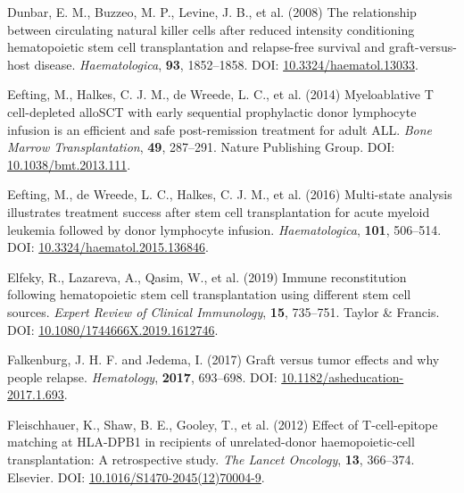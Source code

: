\documentclass[
  letterpaper,
  DIV=11,
  numbers=noendperiod]{scrreprt}
\newlength{\cslhangindent}
\newlength{\cslentryspacingunit} %
\newenvironment{CSLReferences}[2] %
 {%
  \setlength{\parindent}{0pt}
  \ifodd #1
  \let\oldpar\par
  \def\par{\hangindent=\cslhangindent\oldpar}
  \fi
  \setlength{\parskip}{#2\cslentryspacingunit}
 }%
 {}
\begin{document}
\begin{CSLReferences}{1}{0}
\leavevmode{}%
Dunbar, E. M., Buzzeo, M. P., Levine, J. B., et al. (2008) The
relationship between circulating natural killer cells after reduced
intensity conditioning hematopoietic stem cell transplantation and
relapse-free survival and graft-versus-host disease.
\emph{Haematologica}, \textbf{93}, 1852--1858. DOI:
\href{https://doi.org/10.3324/haematol.13033}{10.3324/haematol.13033}.

\leavevmode{}%
Eefting, M., Halkes, C. J. M., de Wreede, L. C., et al. (2014)
Myeloablative {T} cell-depleted {alloSCT} with early sequential
prophylactic donor lymphocyte infusion is an efficient and safe
post-remission treatment for adult {ALL}. \emph{Bone Marrow
Transplantation}, \textbf{49}, 287--291. Nature Publishing Group. DOI:
\href{https://doi.org/10.1038/bmt.2013.111}{10.1038/bmt.2013.111}.

\leavevmode{}%
Eefting, M., de Wreede, L. C., Halkes, C. J. M., et al. (2016)
Multi-state analysis illustrates treatment success after stem cell
transplantation for acute myeloid leukemia followed by donor lymphocyte
infusion. \emph{Haematologica}, \textbf{101}, 506--514. DOI:
\href{https://doi.org/10.3324/haematol.2015.136846}{10.3324/haematol.2015.136846}.

\leavevmode{}%
Elfeky, R., Lazareva, A., Qasim, W., et al. (2019) Immune reconstitution
following hematopoietic stem cell transplantation using different stem
cell sources. \emph{Expert Review of Clinical Immunology}, \textbf{15},
735--751. Taylor \& Francis. DOI:
\href{https://doi.org/10.1080/1744666X.2019.1612746}{10.1080/1744666X.2019.1612746}.

\leavevmode{}%
Falkenburg, J. H. F. and Jedema, I. (2017) Graft versus tumor effects
and why people relapse. \emph{Hematology}, \textbf{2017}, 693--698. DOI:
\href{https://doi.org/10.1182/asheducation-2017.1.693}{10.1182/asheducation-2017.1.693}.

\leavevmode{}%
Fleischhauer, K., Shaw, B. E., Gooley, T., et al. (2012) Effect of
{T-cell-epitope} matching at {HLA-DPB1} in recipients of unrelated-donor
haemopoietic-cell transplantation: A retrospective study. \emph{The
Lancet Oncology}, \textbf{13}, 366--374. Elsevier. DOI:
\href{https://doi.org/10.1016/S1470-2045(12)70004-9}{10.1016/S1470-2045(12)70004-9}.


\end{CSLReferences}
\end{document}
